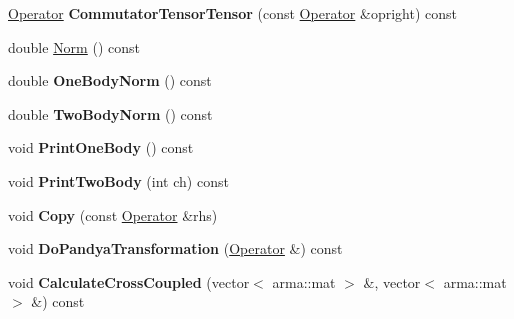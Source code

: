 \begin{DoxyCompactItemize}
\item 
\hypertarget{classOperator_ab5a2d58468b9f4a9f551613f5ce36fd1}{\hyperlink{classOperator}{Operator} {\bfseries Commutator\-Tensor\-Tensor} (const \hyperlink{classOperator}{Operator} \&opright) const }\label{classOperator_ab5a2d58468b9f4a9f551613f5ce36fd1}

\item 
double \hyperlink{classOperator_acb9d7959232a636191b91f6bf5b7b0c8}{Norm} () const 
\item 
\hypertarget{classOperator_a72dc7aea85c7775097d235de6f17f330}{double {\bfseries One\-Body\-Norm} () const }\label{classOperator_a72dc7aea85c7775097d235de6f17f330}

\item 
\hypertarget{classOperator_af1c40bdef64ec9abd5d95e8328565a67}{double {\bfseries Two\-Body\-Norm} () const }\label{classOperator_af1c40bdef64ec9abd5d95e8328565a67}

\item 
\hypertarget{classOperator_a5ec5a8110337108ac31d3af7337e454b}{void {\bfseries Print\-One\-Body} () const }\label{classOperator_a5ec5a8110337108ac31d3af7337e454b}

\item 
\hypertarget{classOperator_a905e42cefafaca0eb155cf41b3cd37b8}{void {\bfseries Print\-Two\-Body} (int ch) const }\label{classOperator_a905e42cefafaca0eb155cf41b3cd37b8}

\item 
\hypertarget{classOperator_a851708e76dd24603d0527f6c5c1bd544}{void {\bfseries Copy} (const \hyperlink{classOperator}{Operator} \&rhs)}\label{classOperator_a851708e76dd24603d0527f6c5c1bd544}

\item 
\hypertarget{classOperator_a70139e405d99a645f57c37ccd2294c75}{void {\bfseries Do\-Pandya\-Transformation} (\hyperlink{classOperator}{Operator} \&) const }\label{classOperator_a70139e405d99a645f57c37ccd2294c75}

\item 
\hypertarget{classOperator_a4b36a16fac41d3465e9303960c3509f4}{void {\bfseries Calculate\-Cross\-Coupled} (vector$<$ arma\-::mat $>$ \&, vector$<$ arma\-::mat $>$ \&) const }\label{classOperator_a4b36a16fac41d3465e9303960c3509f4}


\end{DoxyCompactItemize}
